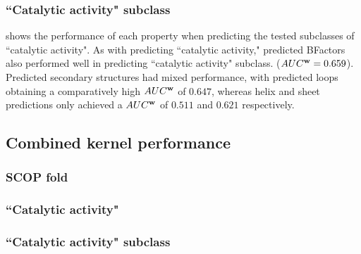 \subsubsection{``Catalytic activity" subclass}
 shows the performance of each property when predicting the tested subclasses of ``catalytic activity".  As with predicting ``catalytic activity," predicted BFactors also performed well in predicting ``catalytic activity" subclass.  ($AUC^{\bf{w}}=0.659$).  Predicted secondary structures had mixed performance, with predicted loops obtaining a comparatively high $AUC^{\bf{w}}$ of $0.647$, whereas helix and sheet predictions only achieved a $AUC^{\bf{w}}$ of $0.511$ and $0.621$ respectively.



\subsection{Combined kernel performance}

\subsubsection{SCOP fold}


\subsubsection{``Catalytic activity"}

\subsubsection{``Catalytic activity" subclass}




